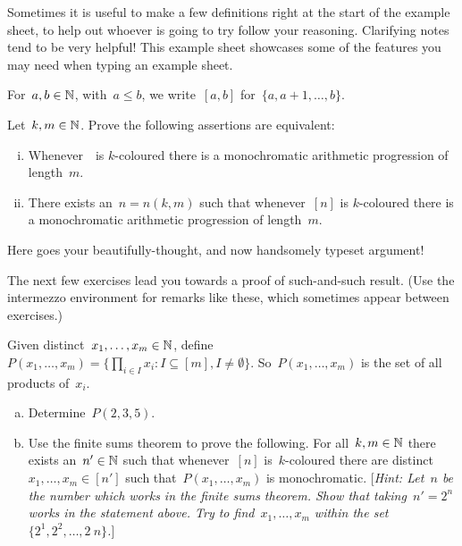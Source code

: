 


\noindent Sometimes it is useful to make a few definitions right at the start of the example sheet,
to help out whoever is going to try follow your reasoning. Clarifying notes tend to be very helpful!
This example sheet showcases some of the features you may need when typing an example sheet.

For~$a,b\in\mathbb{N}$, with~$a\leq b$, we write~$[a,b]$
for~$\{a,a+1,\ldots,b\}$.

\smallskip


\begin{question}
Let~$k,m\in\mathbb{N}$. Prove the following assertions are equivalent:
\begin{enumerate}[(i)]
\item Whenever~\bbn\ is $k$-coloured there is a monochromatic arithmetic progression of length~$m$.
\item There exists an~$n=n(k,m)$ such that whenever~$[n]$ is $k$-coloured
      there is a monochromatic arithmetic progression of length~$m$.
\end{enumerate}
\end{question}

\begin{answer}
Here goes your beautifully-thought, and now handsomely typeset argument!
\end{answer}

\begin{intermezzo}
The next few exercises lead you towards a proof of such-and-such result.
(Use the intermezzo environment for remarks like these, which sometimes appear between exercises.)
\end{intermezzo}

\begin{question}
Given distinct~$x_1,\ldots,x_m\in\mathbb{N}$,
define~$P(x_1,\ldots,x_m)=\{\prod_{i\in I} x_i\colon I\subseteq [m],I\neq \emptyset\}$.
So~$P(x_1,\ldots,x_m)$ is the set of all products of~$x_i$.
\begin{enumerate}[(a)]
\item Determine~$P(2,3,5)$.
\item Use the finite sums theorem to prove the following.
For all~$k,m\in\mathbb{N}$ there exists an~$n'\in\mathbb{N}$ such that
whenever~$[n]$ is~$k$-coloured there are distinct~$x_1,\ldots,x_m\in[n']$
such that~$P(x_1,\ldots,x_m)$ is monochromatic.
[\emph{Hint: Let~$n$ be the number which works in the finite sums theorem.
Show that taking~$n'=2^n$ works in the statement above.
Try to find~$x_1,\ldots,x_m$ within the set~$\{2^1,2^2,\ldots,2~n\}$.}]
\end{enumerate}
\end{question}


